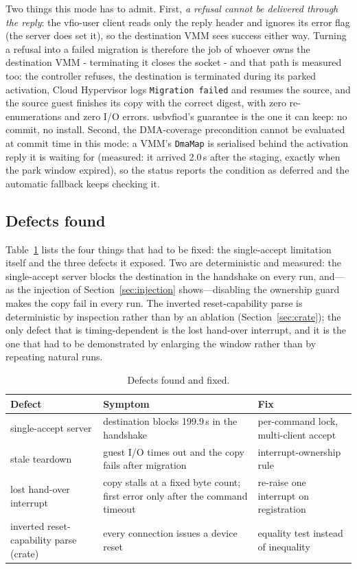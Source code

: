 \documentclass[10pt,conference]{IEEEtran}
\newcommand{\code}[1]{\texttt{#1}}
\begin{document}
Two things this mode has to admit. First, \emph{a refusal cannot be delivered
through the reply}: the vfio-user client reads only the reply header and ignores
its error flag (the server does set it), so the destination VMM sees success
either way. Turning a refusal into a failed migration is therefore the job of
whoever owns the destination VMM - terminating it closes the socket - and that
path is measured too: the controller refuses, the destination is terminated
during its parked activation, Cloud Hypervisor logs \code{Migration failed} and
resumes the source, and the source guest finishes its copy with the correct
digest, with zero re-enumerations and zero I/O errors. usbvfiod's guarantee is
the one it can keep: no commit, no install. Second, the DMA-coverage
precondition cannot be evaluated at commit time in this mode: a VMM's
\code{DmaMap} is serialised behind the activation reply it is waiting for
(measured: it arrived 2.0\,s after the staging, exactly when the park window
expired), so the status reports the condition as deferred and the automatic
fallback keeps checking it.

\subsection{Defects found}
Table~\ref{tab:defects} lists the four things that had to be fixed: the
single-accept limitation itself and the three defects it exposed. Two are
deterministic and measured: the single-accept server blocks the destination in
the handshake on every run, and---as the injection of
Section~\ref{sec:injection} shows---disabling the ownership guard makes the copy
fail in every run. The inverted reset-capability parse is deterministic by
inspection rather than by an ablation (Section~\ref{sec:crate}); the only
defect that is timing-dependent is the lost hand-over interrupt, and it is the
one that had to be demonstrated by enlarging the window rather than by repeating
natural runs.

\begin{table}[t]
\centering
\caption{Defects found and fixed.}
\label{tab:defects}
\footnotesize
\setlength{\tabcolsep}{3pt}
\begin{tabular}{@{}>{\raggedright\arraybackslash}p{1.8cm}>{\raggedright\arraybackslash}p{2.1cm}p{3.1cm}@{}}
\toprule
Defect & Symptom & Fix \\
\midrule
single-accept server & destination blocks 199.9\,s in the handshake & per-command lock, multi-client accept \\
stale teardown & guest I/O times out and the copy fails after migration & interrupt-ownership rule \\
lost hand-over interrupt & copy stalls at a fixed byte count; first error only after the command timeout & re-raise one interrupt on registration \\
inverted reset-capability parse (crate) & every connection issues a device reset & equality test instead of inequality \\
\bottomrule
\end{tabular}
\end{table}
\end{document}
